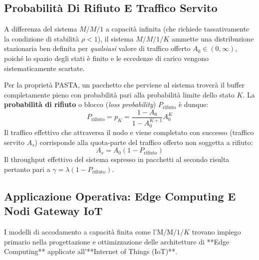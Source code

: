 \documentclass[11pt, a4paper]{article}
\begin{document}

\subsection{Probabilità Di Rifiuto E Traffico Servito}

A differenza del sistema $M/M/1$ a capacità infinita (che richiede tassativamente la condizione di stabilità $\rho < 1$), il sistema $M/M/1/K$ ammette una distribuzione stazionaria ben definita per \emph{qualsiasi} valore di traffico offerto $A_0 \in (0, \infty)$, poiché lo spazio degli stati è finito e le eccedenze di carico vengono sistematicamente scartate.

Per la proprietà PASTA, un pacchetto che perviene al sistema troverà il buffer completamente pieno con probabilità pari alla probabilità limite dello stato $K$. La \textbf{probabilità di rifiuto} o blocco (\emph{loss probability}) $P_{\text{rifiuto}}$ è dunque:
\[
P_{\text{rifiuto}} = p_K = \frac{1 - A_0}{1 - A_0^{K+1}} A_0^K
\]
Il traffico effettivo che attraversa il nodo e viene completato con successo (traffico servito $A_s$) corrisponde alla quota-parte del traffico offerto non soggetta a rifiuto:
\[
A_s = A_0 (1 - P_{\text{rifiuto}})
\]
Il throughput effettivo del sistema espresso in pacchetti al secondo risulta pertanto pari a $\gamma = \lambda (1 - P_{\text{rifiuto}})$.

\subsection{Applicazione Operativa: Edge Computing E Nodi Gateway IoT}

I modelli di accodamento a capacità finita come l'$\text{M/M/1/}K$ trovano impiego primario nella progettazione e ottimizzazione delle architetture di **Edge Computing** applicate all'**Internet of Things (IoT)**.

\end{document}
